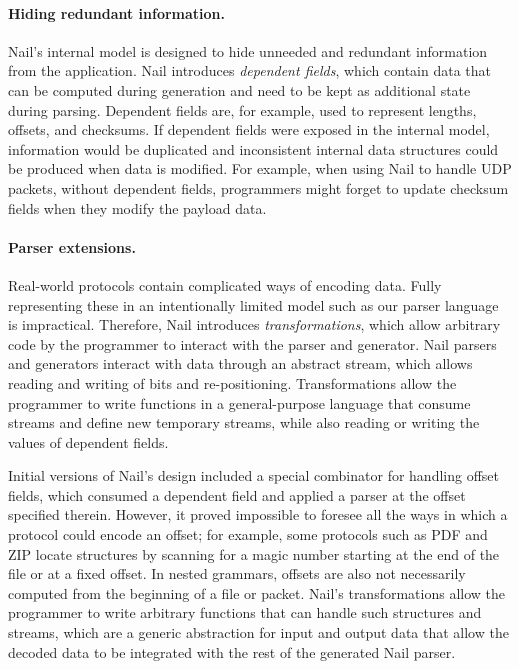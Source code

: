\paragraph{Hiding redundant information.}
Nail's internal model is designed to hide unneeded and redundant information from the application.
Nail introduces \emph{dependent fields}, which contain data that can be computed during generation
and need to be kept as additional state during parsing. Dependent fields are, for example, used to represent
lengths, offsets, and checksums. If dependent fields were exposed in the internal model, information
would be duplicated and inconsistent internal data structures could be produced when data is
modified. For example, when using Nail to handle UDP packets, without dependent fields, programmers
might forget to update checksum fields when they modify the payload data.

\paragraph{Parser extensions.}
Real-world protocols contain complicated ways of encoding data. Fully representing these in an
intentionally limited model such as our parser language is impractical. Therefore, Nail introduces
\emph{transformations}, which allow arbitrary code by the programmer to interact with the parser and
generator. Nail parsers and generators interact with data through an abstract stream, which allows
reading and writing of bits and re-positioning. Transformations allow the programmer to write
functions in a general-purpose language that consume streams and define new temporary streams, while
also reading or writing the values of dependent fields.

Initial versions of Nail's design included a special combinator for handling offset fields,
which consumed a dependent field and applied
a parser at the offset specified therein. However, it proved impossible to foresee all the ways in which a protocol could encode an offset;
for example, some protocols such as PDF and ZIP locate structures by scanning for a magic number starting at the
end of the file or at a fixed offset. In nested grammars, offsets are also not necessarily computed from
the beginning of a file or packet.
Nail's transformations allow the programmer to write arbitrary functions that can
handle such structures and streams, which are a generic abstraction for input and
output data that allow the decoded data to be integrated with the rest of the
generated Nail parser.


